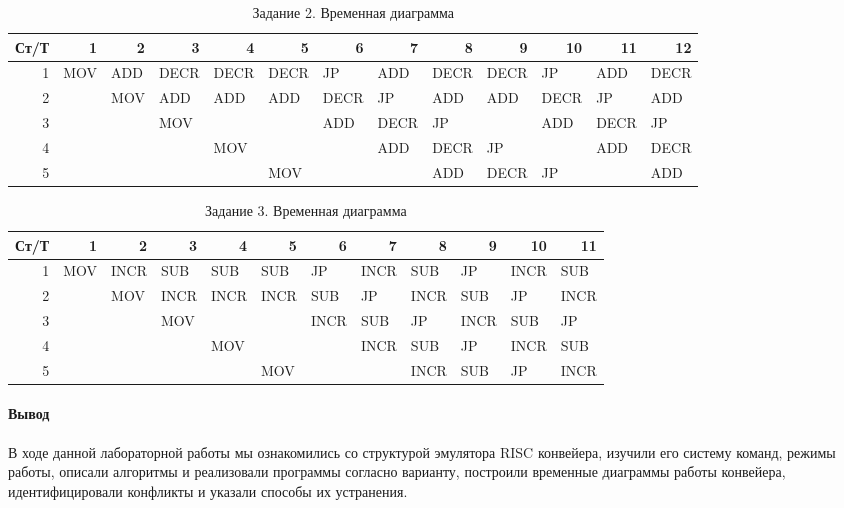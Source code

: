 \documentclass[a4paper,14pt]{extarticle}
\begin{document}
\begin{landscape}
\begin{table}[htbp]
	\centering
	\begin{tabular}{|r|l|l|l|l|l|l|l|l|l|l|l|l|}
		\hline
		\multicolumn{1}{|l|}{Ст/Т} & \multicolumn{1}{r|}{1} & \multicolumn{1}{r|}{2} & \multicolumn{1}{r|}{3} & \multicolumn{1}{r|}{4} & \multicolumn{1}{r|}{5} & \multicolumn{1}{r|}{6} & \multicolumn{1}{r|}{7} & \multicolumn{1}{r|}{8} & \multicolumn{1}{r|}{9} & \multicolumn{1}{r|}{10} & \multicolumn{1}{r|}{11} & \multicolumn{1}{r|}{12} \\ \hline
		1 & MOV & ADD & DECR & DECR & DECR & JP & ADD & DECR & DECR & JP & ADD & DECR \\ \hline
		2 &  & MOV & ADD & ADD & ADD & DECR & JP & ADD & ADD & DECR & JP & ADD \\ \hline
		3 &  &  & MOV &  &  & ADD & DECR & JP &  & ADD & DECR & JP \\ \hline
		4 &  &  &  & MOV &  &  & ADD & DECR & JP &  & ADD & DECR \\ \hline
		5 &  &  &  &  & MOV &  &  & ADD & DECR & JP &  & ADD \\ \hline
	\end{tabular}
	\caption{Задание 2. Временная диаграмма}
	\label{tab:time-2}
\end{table}

\begin{table}[htbp]
	\centering
	\begin{tabular}{|r|l|l|l|l|l|l|l|l|l|l|l|}
		\hline
		\multicolumn{1}{|l|}{Ст/Т} & \multicolumn{1}{r|}{1} & \multicolumn{1}{r|}{2} & \multicolumn{1}{r|}{3} & \multicolumn{1}{r|}{4} & \multicolumn{1}{r|}{5} & \multicolumn{1}{r|}{6} & \multicolumn{1}{r|}{7} & \multicolumn{1}{r|}{8} & \multicolumn{1}{r|}{9} & \multicolumn{1}{r|}{10} & \multicolumn{1}{r|}{11} \\ \hline
		1 & MOV & INCR & SUB & SUB & SUB & JP & INCR & SUB & JP & INCR & SUB \\ \hline
		2 &  & MOV & INCR & INCR & INCR & SUB & JP & INCR & SUB & JP & INCR \\ \hline
		3 &  &  & MOV &  &  & INCR & SUB & JP & INCR & SUB & JP \\ \hline
		4 &  &  &  & MOV &  &  & INCR & SUB & JP & INCR & SUB \\ \hline
		5 &  &  &  &  & MOV &  &  & INCR & SUB & JP & INCR \\ \hline
	\end{tabular}
	\caption{Задание 3. Временная диаграмма}
	\label{tab:time-3}
\end{table}

\end{landscape}


\paragraph{Вывод}

В ходе данной лабораторной работы мы ознакомились со структурой эмулятора RISC конвейера, изучили его систему команд, режимы работы, описали алгоритмы и реализовали программы согласно варианту, построили временные диаграммы работы конвейера, идентифицировали конфликты и указали способы их устранения.
\end{document}
